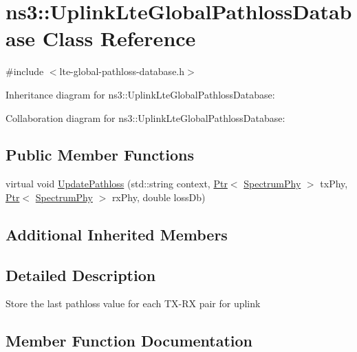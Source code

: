 \hypertarget{classns3_1_1UplinkLteGlobalPathlossDatabase}{}\section{ns3\+:\+:Uplink\+Lte\+Global\+Pathloss\+Database Class Reference}
\label{classns3_1_1UplinkLteGlobalPathlossDatabase}


{\ttfamily \#include $<$lte-\/global-\/pathloss-\/database.\+h$>$}



Inheritance diagram for ns3\+:\+:Uplink\+Lte\+Global\+Pathloss\+Database\+:


Collaboration diagram for ns3\+:\+:Uplink\+Lte\+Global\+Pathloss\+Database\+:
\subsection*{Public Member Functions}
\begin{DoxyCompactItemize}
\item 
virtual void \hyperlink{classns3_1_1UplinkLteGlobalPathlossDatabase_a28ac651fd5a7e525095a3ffa117725d8}{Update\+Pathloss} (std\+::string context, \hyperlink{classns3_1_1Ptr}{Ptr}$<$ \hyperlink{classns3_1_1SpectrumPhy}{Spectrum\+Phy} $>$ tx\+Phy, \hyperlink{classns3_1_1Ptr}{Ptr}$<$ \hyperlink{classns3_1_1SpectrumPhy}{Spectrum\+Phy} $>$ rx\+Phy, double loss\+Db)
\end{DoxyCompactItemize}
\subsection*{Additional Inherited Members}


\subsection{Detailed Description}
Store the last pathloss value for each T\+X-\/\+RX pair for uplink 

\subsection{Member Function Documentation}
